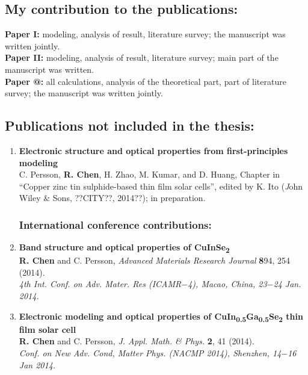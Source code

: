 \documentclass[a4paper, 12pt, titlepage,oneside,drop]{kthesis}
\makeatletter
\newcommand{\Rmnum}[1]{\expandafter\@slowromancap\romannumeral #1@}
\makeatother
\begin{document}
\subsection*{My contribution to the publications:}

\textbf{Paper I:} modeling, analysis of result, literature survey;
the manuscript was written jointly.\\
\textbf{Paper II:} modeling, analysis of result, literature survey; main part of the manuscript was written.\\
\textbf{Paper \Rmnum{3}:} all calculations, analysis of the theoretical part, part of literature survey;
the manuscript was written jointly.\\

\subsection*{Publications not included in the thesis:}
\begin{enumerate}
\renewcommand{\labelenumi}{\Roman{enumi}}
\setcounter{enumi}{3}

\subsubsection*{Book chapter:}
\item{}\textbf{Electronic structure and optical properties from first-principles modeling} \\
C. Persson, \textbf{R. Chen}, H. Zhao, M. Kumar, and D. Huang, Chapter in “Copper zinc tin sulphide-based thin film solar cells”,
edited by K. Ito ({\textit John Wiley $\&$ Sons}, ??CITY??, 2014??); in preparation.



\subsubsection*{International conference contributions:}
\renewcommand{\labelenumi}{\Roman{enumi}}
\setcounter{enumi}{4}

\item{} \textbf{Band structure and optical properties of CuInSe\textsubscript{2}}
\\ \textbf{R. Chen} and C. Persson, 
\textit{Advanced Materials Research Journal} {\textbf 894}, 254 (2014). \\
\textit{4th Int. Conf. on Adv. Mater. Res (ICAMR$-$4), Macao, China, 23$-$24 Jan. 2014.}


\item{} \textbf{Electronic modeling and optical properties of CuIn\textsubscript{0.5}Ga\textsubscript{0.5}Se\textsubscript{2} thin film solar cell}
\\ \textbf{R. Chen} and C. Persson,
\textit{J. Appl. Math. \& Phys.} {\textbf 2}, 41 (2014). \\
\textit{Conf. on New Adv. Cond, Matter Phys. (NACMP 2014), Shenzhen, 14$-$16 Jan 2014.}

\end{enumerate}
\end{document}
